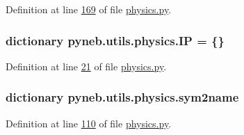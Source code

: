 Definition at line \hyperlink{physics_8py_source_l00169}{169} of file \hyperlink{physics_8py_source}{physics.\+py}.

\hypertarget{namespacepyneb_1_1utils_1_1physics_a041738a1b0abdb597dd654aec4d96757}{}
\subsubsection[{I\+P}]{\setlength{\rightskip}{0pt plus 5cm}dictionary pyneb.\+utils.\+physics.\+I\+P = \{\}}\label{namespacepyneb_1_1utils_1_1physics_a041738a1b0abdb597dd654aec4d96757}


Definition at line \hyperlink{physics_8py_source_l00021}{21} of file \hyperlink{physics_8py_source}{physics.\+py}.

\hypertarget{namespacepyneb_1_1utils_1_1physics_aaad8df22981701858aa5539c86a96b5b}{}
\subsubsection[{sym2name}]{\setlength{\rightskip}{0pt plus 5cm}dictionary pyneb.\+utils.\+physics.\+sym2name}\label{namespacepyneb_1_1utils_1_1physics_aaad8df22981701858aa5539c86a96b5b}


Definition at line \hyperlink{physics_8py_source_l00110}{110} of file \hyperlink{physics_8py_source}{physics.\+py}.

